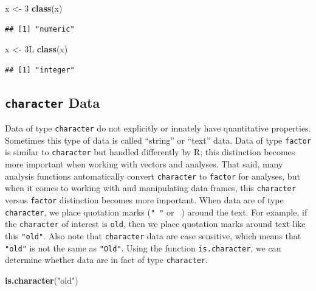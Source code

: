 \documentclass[]{book}
\newenvironment{Shaded}{\begin{snugshade}}{\end{snugshade}}
\newcommand{\KeywordTok}[1]{\textcolor[rgb]{0.13,0.29,0.53}{\textbf{#1}}}
\newcommand{\DecValTok}[1]{\textcolor[rgb]{0.00,0.00,0.81}{#1}}
\newcommand{\StringTok}[1]{\textcolor[rgb]{0.31,0.60,0.02}{#1}}
\newcommand{\NormalTok}[1]{#1}
\begin{document}
\begin{Shaded}
\begin{Highlighting}[]
\NormalTok{x <-}\StringTok{ }\DecValTok{3}
\KeywordTok{class}\NormalTok{(x)}
\end{Highlighting}
\end{Shaded}

\begin{verbatim}
## [1] "numeric"
\end{verbatim}

\begin{Shaded}
\begin{Highlighting}[]
\NormalTok{x <-}\StringTok{ }\NormalTok{3L}
\KeywordTok{class}\NormalTok{(x)}
\end{Highlighting}
\end{Shaded}

\begin{verbatim}
## [1] "integer"
\end{verbatim}

\subsection{\texorpdfstring{\texttt{character}
Data}{character Data}}\label{character-data}

Data of type \texttt{character} do not explicitly or innately have
quantitative properties. Sometimes this type of data is called
``string'' or ``text'' data. Data of type \texttt{factor} is similar to
\texttt{character} but handled differently by R; this distinction
becomes more important when working with vectors and analyses. That
said, many analysis functions automatically convert \texttt{character}
to \texttt{factor} for analyses, but when it comes to working with and
manipulating data frames, this \texttt{character} versus \texttt{factor}
distinction becomes more important. When data are of type
\texttt{character}, we place quotation marks (\texttt{"\ "} or
\texttt{\textquotesingle{}\ \textquotesingle{}}) around the text. For
example, if the \texttt{character} of interest is \texttt{old}, then we
place quotation marks around text like this \texttt{"old"}. Also note
that \texttt{character} data are case sensitive, which means that
\texttt{"old"} is not the same as \texttt{"Old"}. Using the function
\texttt{is.character}, we can determine whether data are in fact of type
\texttt{character}.

\begin{Shaded}
\begin{Highlighting}[]
\KeywordTok{is.character}\NormalTok{(}\StringTok{"old"}\NormalTok{)}
\end{Highlighting}
\end{Shaded}
\end{document}
